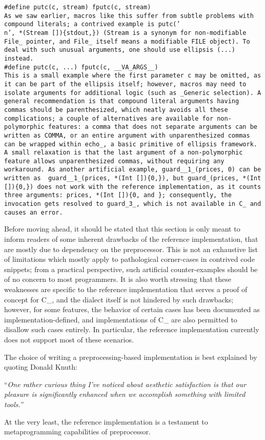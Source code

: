 \tt{#define putc(c, stream) fputc(c, stream)}\\

As we saw earlier, macros like this suffer from subtle problems with compound
literals; a contrived example is \tt{putc('\\n', *(Stream [])\{stdout,\})}
(\tt{Stream} is a synonym for non-modifiable \tt{File_} pointer,
and \tt{File_} itself means a modifiable \tt{FILE} object).
To deal with such unusual arguments,
one should use ellipsis (\tt{...}) instead.\\

\tt{#define putc(c, ...) fputc(c, __VA_ARGS__)}\\

This is a small example where the first parameter \tt{c} may be omitted,
as it can be part of the ellipsis itself; however, macros may need to
isolate arguments for additional logic (such as \tt{_Generic} selection).
A general recommendation is that compound literal arguments having commas
should be parenthesized, which neatly avoids all these complications;
a couple of alternatives are available for non-polymorphic features:
a comma that does not separate arguments can be written as \tt{COMMA},
or an entire argument with unparenthesized commas can be wrapped
within \tt{echo_}, a basic primitive of ellipsis framework.
A small relaxation is that the last argument of a non-polymorphic
feature allows unparenthesized commas, without requiring any workaround.
As another artificial example, \tt{guard__1_(prices, 0)} can be written as \tt
{guard__1_(prices, *(Int [])\{0,\})}, but \tt{guard_(prices, *(Int [])\{0,\})}
does not work with the reference implementation, as it counts three arguments:
\tt{prices}, \tt{*(Int [])\{0}, and \tt{\}}; consequently, the invocation gets
resolved to \tt{guard_3_}, which is not available in C\_ and causes an error.

Before moving ahead, it should be stated that this section is only meant
to inform readers of some inherent drawbacks of the reference implementation,
that are mostly due to dependency on the preprocessor.
This is not an exhaustive list of limitations which mostly apply to pathological
corner-cases in contrived code snippets; from a practical perspective,
such artificial counter-examples should be of no concern to most programmers.
It is also worth stressing that these weaknesses are specific to the
reference implementation that serves a proof of concept for C\_, and the dialect
itself is not hindered by such drawbacks; however, for some features, the
behavior of certain cases has been documented as implementation-defined,
and implementations of C\_ are also permitted to disallow such cases entirely.
In particular, the reference implementation
currently does not support most of these scenarios.

\note The choice of writing a preprocessing-based
implementation is best explained by quoting Donald Knuth:

``\it{One rather curious thing I've noticed about aesthetic
satisfaction is that our pleasure is significantly enhanced
when we accomplish something with limited tools.}''

At the very least, the reference implementation is a
testament to metaprogramming capabilities of preprocessor.
